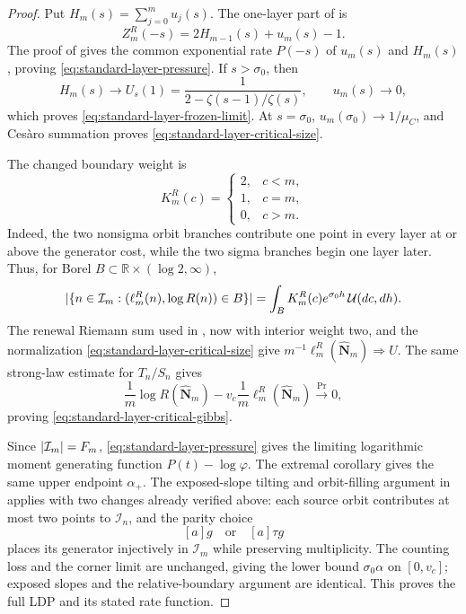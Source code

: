 \begin{proof}
Put \(H_m(s)=\sum_{j=0}^m u_j(s)\).  The one-layer part of
 is
\begin{equation}
 Z_m^R(-s)=2H_{m-1}(s)+u_m(s)-1.
 \label{eq:standard-layer-renewal}
\end{equation}
The proof of  gives the common exponential rate
\(P(-s)\) of \(u_m(s)\) and \(H_m(s)\), proving
\eqref{eq:standard-layer-pressure}.  If \(s>\sigma_0\), then
\[
 H_m(s)\longrightarrow U_s(1)
 =\frac1{2-\zeta(s-1)/\zeta(s)},
 \qquad u_m(s)\longrightarrow0,
\]
which proves \eqref{eq:standard-layer-frozen-limit}.  At \(s=\sigma_0\),
\(u_m(\sigma_0)\to1/\mu_C\), and Ces\`aro summation proves
\eqref{eq:standard-layer-critical-size}.

The changed boundary weight is
\[
 K_m^R(c)=
 \begin{cases}
 2,&c<m,\\
 1,&c=m,\\
 0,&c>m.
 \end{cases}
\]
Indeed, the two nonsigma orbit branches contribute one point in every layer
at or above the generator cost, while the two sigma branches begin one layer
later.  Thus, for Borel
\(B\subset\mathbb R\times(\log2,\infty)\),
\begin{equation}
 \lvert \{n\in\mathcal I_m:
 (\ell_m^R(n),\log R(n))\in B\} \rvert
 =\int_BK_m^R(c)e^{\sigma_0h}\,\mathcal U(dc,dh).
 \label{eq:standard-layer-marked-count}
\end{equation}
The renewal Riemann sum used in
, now with interior weight two, and
the normalization \eqref{eq:standard-layer-critical-size} give
\(m^{-1}\ell_m^R(\widehat{\mathbf N}_m)\Rightarrow U\).  The same strong-law
estimate for \(T_n/S_n\) gives
\[
 \frac1m\log R(\widehat{\mathbf N}_m)
 -v_c\frac1m\ell_m^R(\widehat{\mathbf N}_m)
 \xrightarrow{\Pr}0,
\]
proving \eqref{eq:standard-layer-critical-gibbs}.

Since \(\lvert \mathcal I_m \rvert=F_m\), \eqref{eq:standard-layer-pressure} gives
the limiting logarithmic moment generating function
\(P(t)-\log\varphi\).  The extremal corollary gives the same upper endpoint
\(\alpha_+\).  The exposed-slope tilting and orbit-filling argument in
 applies with two changes already verified above:
each source orbit contributes at most two points to \(\mathcal I_n\), and
the parity choice
\[
 [a]g\quad\text{or}\quad[a]\tau g
\]
places its generator injectively in \(\mathcal I_m\) while preserving
multiplicity.  The counting loss and the corner limit are unchanged, giving
the lower bound \(\sigma_0\alpha\) on \([0,v_c]\); exposed slopes and the
relative-boundary argument are identical.  This proves the full LDP and its
stated rate function.
\end{proof}

